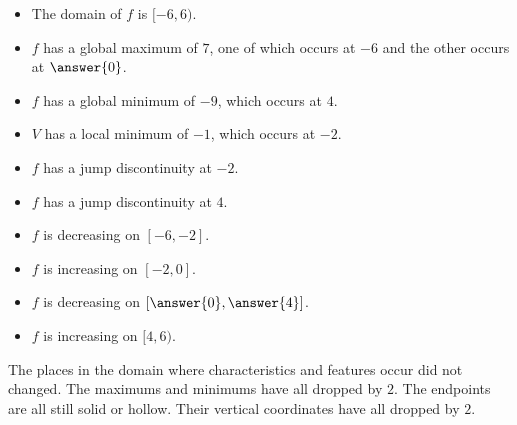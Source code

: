 \documentclass{ximera}
\begin{document}
\begin{example}
\begin{image}
\end{image}







\begin{itemize}

\item The domain of $f$ is $[-6,6)$.
\item $f$ has a global maximum of $7$, one of which occurs at $-6$ and the other occurs at $\answer{0}$.
\item $f$ has a global minimum of $-9$, which occurs at $4$.
\item $V$ has a local minimum of $-1$, which occurs at $-2$.
\item $f$ has a jump discontinuity at $-2$.
\item $f$ has a jump discontinuity at $4$.
\item $f$ is decreasing on $[-6, -2]$.
\item $f$ is increasing on $[-2, 0]$.
\item $f$ is decreasing on $\left[\answer{0}, \answer{4}\right]$.
\item $f$ is increasing on $[4, 6)$.


\end{itemize}



The places in the domain where characteristics and features occur did not changed.  The maximums and minimums have all dropped by $2$.  The endpoints are all still solid or hollow.  Their vertical coordinates have all dropped by $2$.






\end{example}
\end{document}
